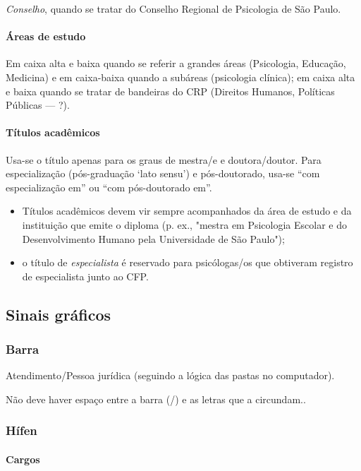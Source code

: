 \emph{Conselho}, quando se tratar do Conselho Regional de Psicologia de São Paulo.

\paragraph{Áreas de estudo}

Em caixa alta e baixa quando se referir a grandes áreas (Psicologia, Educação, Medicina) e em caixa-baixa quando a subáreas (psicologia clínica); em caixa alta e baixa quando se tratar de bandeiras do CRP (Direitos Humanos, Políticas Públicas --- ?). 

\paragraph{Títulos acadêmicos}

Usa-se o título apenas para os graus de mestra/e e doutora/doutor. Para especialização (pós-graduação `lato sensu') e pós-doutorado, usa-se ``com especialização em'' ou ``com pós-doutorado em''.

\begin{itemize}
\item Títulos acadêmicos devem vir sempre acompanhados da área de estudo e da instituição que emite o diploma (p. ex., "mestra em Psicologia Escolar e do Desenvolvimento Humano pela Universidade de São Paulo");
\item o título de \emph{especialista} é reservado para psicólogas/os que obtiveram registro de especialista junto ao CFP.
\end{itemize}

\subsection{Sinais gráficos}

\subsubsection{Barra}

Atendimento/Pessoa jurídica (seguindo a lógica das pastas no computador).

Não deve haver espaço entre a barra (/) e as letras que a circundam..

\subsubsection{Hífen}

\paragraph{Cargos}

